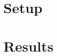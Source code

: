 \hypertarget{experiments}{
}


\section{Setup}\label{sec:Experiments}
\section{Results}\label{sec:Results}

